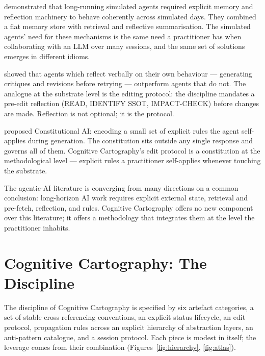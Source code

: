 \documentclass[11pt,a4paper,twocolumn]{article}
\begin{document}
\citet{park2023generativeagents} demonstrated that long-running
simulated agents required explicit memory and reflection machinery
to behave coherently across simulated days. They combined a flat
memory store with retrieval and reflective summarisation. The
simulated agents' need for these mechanisms is the same need a
practitioner has when collaborating with an LLM over many sessions,
and the same set of solutions emerges in different idioms.

\citet{shinn2023reflexion} showed that agents which reflect verbally
on their own behaviour --- generating critiques and revisions
before retrying --- outperform agents that do not. The analogue at
the substrate level is the editing protocol: the discipline mandates
a pre-edit reflection (READ, IDENTIFY SSOT, IMPACT-CHECK) before
changes are made. Reflection is not optional; it is the protocol.

\citet{bai2022constitutional} proposed Constitutional AI: encoding a
small set of explicit rules the agent self-applies during
generation. The constitution sits outside any single response and
governs all of them. Cognitive Cartography's edit protocol is a
constitution at the methodological level --- explicit rules a
practitioner self-applies whenever touching the substrate.

The agentic-AI literature is converging from many directions on a
common conclusion: long-horizon AI work requires explicit external
state, retrieval and pre-fetch, reflection, and rules. Cognitive
Cartography offers no new component over this literature; it offers
a methodology that integrates them at the level the practitioner
inhabits.

\section{Cognitive Cartography: The Discipline}
\label{sec:discipline}

The discipline of Cognitive Cartography is specified by six
artefact categories, a set of stable cross-referencing conventions,
an explicit status lifecycle, an edit protocol, propagation rules
across an explicit hierarchy of abstraction layers, an anti-pattern
catalogue, and a session protocol. Each piece is modest in itself;
the leverage comes from their combination
(Figures~\ref{fig:hierarchy}, \ref{fig:atlas}).
\end{document}
